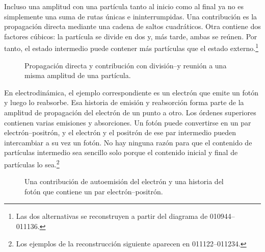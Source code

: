Incluso una amplitud con una partícula tanto al inicio como al final ya no es simplemente una suma de rutas únicas e ininterrumpidas. Una contribución es la propagación directa mediante una cadena de saltos cuadráticos. Otra contiene dos factores cúbicos: la partícula se divide en dos y, más tarde, ambas se reúnen. Por tanto, el estado intermedio puede contener más partículas que el estado externo.\footnote{Las dos alternativas se reconstruyen a partir del diagrama de 010944--011136.}

\begin{figure}[htbp]\centering
{}\caption{Propagación directa y contribución con división--y reunión a una misma amplitud de una partícula.}\end{figure}

En electrodinámica, el ejemplo correspondiente es un electrón que emite un fotón y luego lo reabsorbe. Esa historia de emisión y reabsorción forma parte de la amplitud de propagación del electrón de un punto a otro. Los órdenes superiores contienen varias emisiones y absorciones. Un fotón puede convertirse en un par electrón--positrón, y el electrón y el positrón de ese par intermedio pueden intercambiar a su vez un fotón. No hay ninguna razón para que el contenido de partículas intermedio sea sencillo solo porque el contenido inicial y final de partículas lo sea.\footnote{Los ejemplos de la reconstrucción siguiente aparecen en 011122--011234.}

\begin{figure}[htbp]\centering
{}\caption{Una contribución de autoemisión del electrón y una historia del fotón que contiene un par electrón--positrón.}\end{figure}

